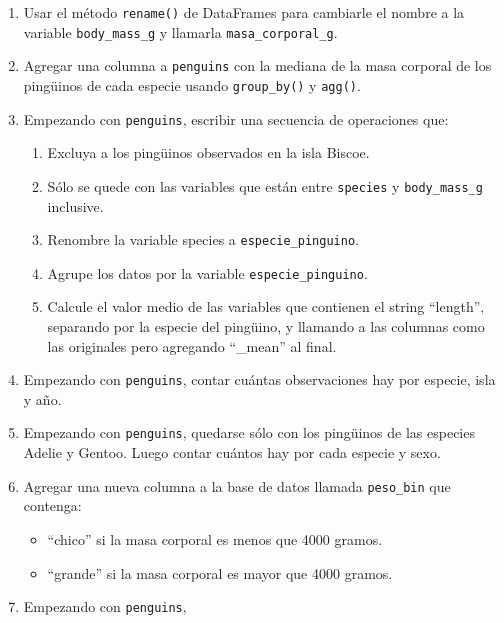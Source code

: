 \documentclass[a4paper,11pt]{article}
\theoremstyle{definition}
\begin{document}
\begin{enumerate}
\item Usar el método \lstinline{rename()} de DataFrames para cambiarle el nombre a la variable \lstinline{body_mass_g} y llamarla \lstinline{masa_corporal_g}.

\item Agregar una columna a \lstinline{penguins} con la mediana de la masa corporal de los ping\"uinos de cada especie usando \lstinline{group_by()} y \lstinline{agg()}.

\item Empezando con \lstinline{penguins}, escribir una secuencia de operaciones que:
\begin{enumerate}
\item Excluya a los ping\"uinos observados en la isla Biscoe.
\item Sólo se quede con las variables que están entre \lstinline{species} y \lstinline{body_mass_g} inclusive.
\item Renombre la variable species a \lstinline{especie_pinguino}.
\item Agrupe los datos por la variable \lstinline{especie_pinguino}.
\item Calcule el valor medio de las variables que contienen el string ``length'', separando por la especie del ping\"uino, y llamando a las columnas como las originales pero agregando ``\_mean'' al final.
\end{enumerate}

\item Empezando con \lstinline{penguins}, contar cuántas observaciones hay por especie, isla y año.

\item Empezando con \lstinline{penguins}, quedarse sólo con los ping\"uinos de las especies Adelie y Gentoo. Luego contar cuántos hay por cada especie y sexo.

\item Agregar una nueva columna a la base de datos llamada \lstinline{peso_bin} que contenga:
\begin{itemize}
\item ``chico'' si la masa corporal es menos que 4000 gramos.
\item ``grande'' si la masa corporal es mayor que 4000 gramos.
\end{itemize}

\item Empezando con \lstinline{penguins},


\end{enumerate}
\end{document}
